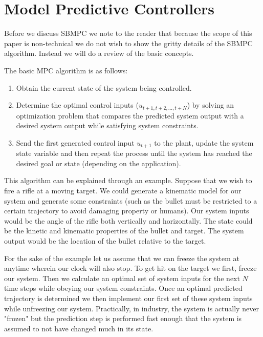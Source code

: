 \documentclass[main.tex]{subfile}
\begin{document}
\section{Model Predictive Controllers} 
\label{sec:sbmpc}

Before we discuss SBMPC we note to the reader that because the scope of this
paper is non-technical we do not wish to show the gritty details of the SBMPC
algorithm. Instead we will do a review of the basic concepts.

The basic MPC algorithm is as follows\cite{autoVehicle}:

\begin{enumerate}
	\item Obtain the current state of the system being controlled.
	\item Determine the optimal control inputs ($u_{t+1,t+2,...,t+N}$) by solving
		an optimization problem that compares the predicted system output with a
		desired system output while satisfying system constraints.
	\item Send the first generated control input $u_{t+1}$ to the plant, update
		the system state variable and then repeat the process until the system has
		reached the desired goal or state (depending on the application).
\end{enumerate}

This algorithm can be explained through an example. Suppose that we wish to fire
a rifle at a moving target. We could generate a kinematic model for our system
and generate some constraints (such as the bullet must be restricted to a
certain trajectory to avoid damaging property or humans). Our system inputs
would be the angle of the rifle both vertically and horizontally. The state
could be the kinetic and kinematic properties of the bullet and target. The
system output would be the location of the bullet relative to the target.

For the sake of the example let us assume that we can freeze the system at
anytime wherein our clock will also stop. To get hit on the target we first,
freeze our system. Then we calculate an optimal set of system inputs for the
next $N$ time steps while obeying our system constraints. Once an optimal
predicted trajectory is determined we then implement our first set of these
system inputs while unfreezing our system. Practically, in industry, the system
is actually never "frozen" but the prediction step is performed fast enough that
the system is assumed to not have changed much in its state.
\end{document}
